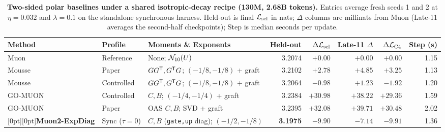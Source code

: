 \begin{table}[!htb]\centering\small
\setlength{\tabcolsep}{4.2pt}
\caption{\textbf{Two-sided polar baselines under a shared isotropic-decay recipe (130M, 2.68B tokens).} Entries average fresh seeds 1 and 2 at $\eta=0.032$ and $\lambda=0.1$ on the standalone synchronous harness. Held-out is final $\mathcal{L}_{\mathrm{sel}}$ in nats; $\Delta$ columns are millinats from Muon (Late-11 averages the second-half checkpoints); Step is median seconds per update.}\label{tab:related}
\begin{tabularx}{\textwidth}{@{}ll>{\raggedright\arraybackslash}Xrrrrr@{}}
\toprule
Method & Profile & Moments \& Exponents & Held-out & $\Delta\mathcal{L}_{\mathrm{sel}}$ & Late-11 $\Delta$ & $\Delta\mathcal{L}_{\mathrm{C4}}$ & Step (s) \\
\midrule
Muon & Reference & None; $\mathcal{N}_{10}(U)$ & 3.2074 & $+0.00$ & $+0.00$ & $+0.00$ & 1.15 \\
Mousse & Paper & $GG^{{\mathsf{T}}}, G^{{\mathsf{T}}}G$; $(-1/8,-1/8)$ + graft & 3.2102 & $+2.78$ & $+4.85$ & $+3.25$ & 1.13 \\
Mousse & Controlled & $GG^{{\mathsf{T}}}, G^{{\mathsf{T}}}G$; $(-1/8,-1/8)$ + graft & 3.2064 & $-0.98$ & $+1.23$ & $-1.92$ & 1.20 \\
GO-MUON & Controlled & $C, B$; $(-1/4,-1/4)$ + graft & 3.2384 & $+30.98$ & $+38.22$ & $+29.36$ & 1.59 \\
GO-MUON & Paper & OAS $C, B$; SVD + graft & 3.2395 & $+32.08$ & $+39.71$ & $+30.48$ & 2.02 \\
\rowcolor{rowtint}[0pt][0pt]\textbf{Muon2-ExpDiag} & Sync ($\tau=0$) & $C, B$ (\texttt{gate,up} diag); $(-1/2,-1/8)$ & \textbf{3.1975} & $\mathbf{-9.90}$ & $\mathbf{-7.14}$ & $\mathbf{-9.91}$ & 1.36 \\
\bottomrule\end{tabularx}
\end{table}
